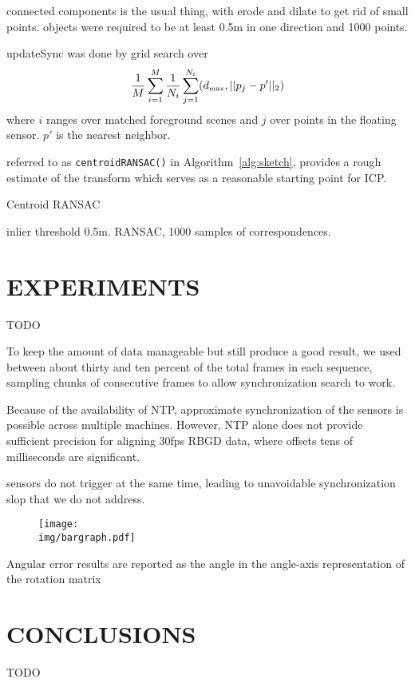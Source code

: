 \documentclass[letterpaper, 10 pt, conference]{ieeeconf}  %
\newcommand{\img}{img}
\begin{document}
connected components is the usual thing, with erode and dilate to get rid of small points.  objects were required to be at least 0.5m in one direction and 1000 points.

updateSync was done by grid search over
\newcommand{\dmax}{d_{\mbox{\tiny{max}}}}
\begin{align*}
  \frac{1}{M} \sum_{i=1}^M \frac{1}{N_i} \sum_{j=1}^{N_i}    (\dmax, ||p_j - p'||_2)
\end{align*}
where $i$ ranges over matched foreground scenes and $j$ over points in the floating sensor.  $p'$ is the nearest neighbor.


referred to as \texttt{centroidRANSAC()} in Algorithm~\ref{alg:sketch}, provides a rough estimate of the transform which serves as a reasonable starting point for ICP.


\begin{algorithm}
  \caption{Centroid RANSAC}
  \label{alg:cal}
  \SetLine
  \phantom{\;}
  inlier threshold 0.5m.  RANSAC, 1000 samples of correspondences.
\end{algorithm}



\section{EXPERIMENTS}
TODO

To keep the amount of data manageable but still produce a good result, we used between about thirty and ten percent of the total frames in each sequence, sampling chunks of consecutive frames to allow synchronization search to work.

Because of the availability of NTP, approximate synchronization of the sensors is possible across multiple machines.  However, NTP alone does not provide sufficient precision for aligning 30fps RBGD data, where offsets tens of milliseconds are significant.


sensors do not trigger at the same time, leading to unavoidable synchronization slop that we do not address.



\begin{figure}
  \centering
  \texttt{[image: \\img/bargraph.pdf]}
  \caption{}
  \label{fig:bargraph}
\end{figure}

\begin{figure}
  \centering
  
  \label{fig:results}
\end{figure}

Angular error results are reported as the angle in the angle-axis representation of the rotation matrix 

\section{CONCLUSIONS}
TODO



\end{document}
